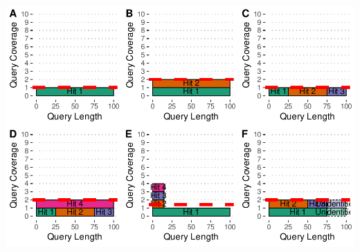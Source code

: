 \documentclass[]{elsarticle} %
\let\origfigure\figure
\let\endorigfigure\endfigure
\renewenvironment{figure}[1][2] {
    \expandafter\origfigure\expandafter[H]
} {
    \endorigfigure
}
\begin{document}
\begin{figure}[H]
\includegraphics[width=6in,]{paper_PLOS_draft_files/figure-latex/SFigure-ECNC-1} \caption{Estimated Copy Number by Coverage (ECNC) consolidates fragmented genes while accounting for missing domains in homologs. \textbf{A)} A single, contiguous gene homolog in a target genome with 100\% query length coverage has an ECNC of 1.0. \textbf{B)} Two contiguous gene homologs, each with 100\% query length coverage have an ECNC of 2.0. \textbf{C)} A single gene homolog, split across multiple scaffolds and contigs in a fragmented target genome; BLAT identifies each fragment as a single hit. Per nucleotide of query sequence, there is only one corresponding nucleotide over all the hits, thus the ECNC is 1.0. \textbf{D)} Two gene homologs, one fragmented and one contiguous. 100\% of nucleotides in the query sequence are represented between all hits; however, every nucleotide in the query has two matching nucleotides in the target genome, thus the ECNC is 2.0. \textbf{E)} One true gene homolog in the target genome, plus multiple hits of a conserved domain that span 20\% of the query sequence. While 100\% of the query sequence is represented in total, 20\% of the nucleotides have 4 hits. Thus, the ECNC for this gene is 1.45. \textbf{F)} Two real gene homologs; one hit is contiguous, one hit is fragmented in two, and the tail end of both sequences was not identified by BLAT due to sequence divergence. Only 75\% of the query sequence was covered in total between the hits, but for that 75\%, each nucleotide has two hits. As such, ECNC is equal to 2.0 for this gene.}\label{fig:SFigure-ECNC}
\end{figure}
\end{document}
